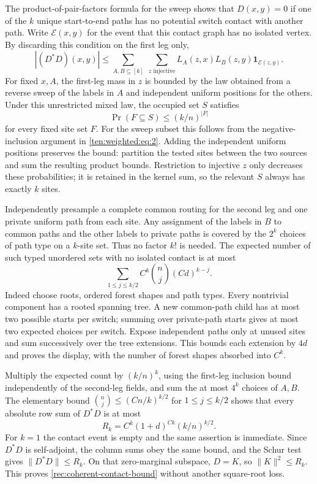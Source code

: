 The product-of-pair-factors formula for the sweep shows that $D(x,y)=0$ if one of the $k$ unique start-to-end paths has no potential switch contact with another path. Write $\mathcal E(x,y)$ for the event that this contact graph has no isolated vertex. By discarding this condition on the first leg only,
\[
 |(D^*D)(x,y)|
 \le\sum_{A,B\subseteq[k]}\ \sum_{z\text{ injective}}
       L_A(z,x)L_B(z,y)\mathbf1_{\mathcal E(z,y)}.
\]
For fixed $x,A$, the first-leg mass in $z$ is bounded by the law obtained from a reverse sweep of the labels in $A$ and independent uniform positions for the others. Under this unrestricted mixed law, the occupied set $S$ satisfies
\[
 \Pr(F\subseteq S)\le(k/n)^{|F|}
\]
for every fixed site set $F$. For the sweep subset this follows from the negative-inclusion argument in \eqref{ten:weighted:eq:2}. Adding the independent uniform positions preserves the bound: partition the tested sites between the two sources and sum the resulting product bounds. Restriction to injective $z$ only decreases these probabilities; it is retained in the kernel sum, so the relevant $S$ always has exactly $k$ sites.

Independently presample a complete common routing for the second leg and one private uniform path from each site. Any assignment of the labels in $B$ to common paths and the other labels to private paths is covered by the $2^k$ choices of path type on a $k$-site set. Thus no factor $k!$ is needed. The expected number of such typed unordered sets with no isolated contact is at most
\begin{equation}\label{rec:coherent-forest-count}
 \sum_{1\le j\le k/2}C^k\binom nj(Cd)^{k-j}.
\end{equation}
Indeed choose roots, ordered forest shapes and path types. Every nontrivial component has a rooted spanning tree. A new common-path child has at most two possible starts per switch; summing over private-path starts gives at most two expected choices per switch. Expose independent paths only at unused sites and sum successively over the tree extensions. This bounds each extension by $4d$ and proves the display, with the number of forest shapes absorbed into $C^k$.

Multiply the expected count by $(k/n)^k$, using the first-leg inclusion bound independently of the second-leg fields, and sum the at most $4^k$ choices of $A,B$. The elementary bound $\binom nj\le(Cn/k)^{k/2}$ for $1\le j\le k/2$ shows that every absolute row sum of $D^*D$ is at most
\[
 R_k=C^k(1+d)^{Ck}(k/n)^{k/2}.
\]
For $k=1$ the contact event is empty and the same assertion is immediate. Since $D^*D$ is self-adjoint, the column sums obey the same bound, and the Schur test gives $\|D^*D\|\le R_k$. On that zero-marginal subspace, $D=K$, so $\|K\|^2\le R_k$. This proves \eqref{rec:coherent-contact-bound} without another square-root loss.

